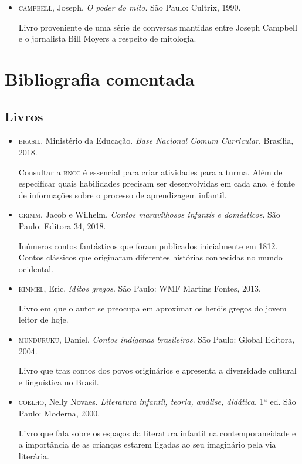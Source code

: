 \documentclass[11pt]{extarticle}
\begin{document}
\begin{itemize}
\item \textsc{campbell}, Joseph. \textit{O poder do mito}. São Paulo: Cultrix, 1990.

Livro proveniente de uma série de conversas mantidas entre Joseph Campbell e o jornalista Bill Moyers a respeito de mitologia.
\end{itemize}

\section{Bibliografia comentada}
\subsection{Livros}

\begin{itemize}
\item \textsc{brasil}. Ministério da Educação. \textit{Base Nacional Comum Curricular}. Brasília, 2018.

Consultar a \textsc{bncc} é essencial para criar atividades para a turma. Além de especificar quais habilidades precisam ser desenvolvidas em cada ano, é fonte de informações sobre o processo de aprendizagem infantil. 
 
 \item \textsc{grimm}, Jacob e Wilhelm. \textit{Contos maravilhosos infantis e domésticos}. São Paulo: Editora 34, 2018.

Inúmeros contos fantásticos que foram publicados inicialmente em 1812. Contos clássicos que originaram diferentes histórias conhecidas no mundo ocidental.

\item \textsc{kimmel}, Eric. \textit{Mitos gregos}. São Paulo: WMF Martins Fontes, 2013.

Livro em que o autor se preocupa em aproximar os heróis gregos do jovem leitor de hoje.

\item \textsc{munduruku}, Daniel. \textit{Contos indígenas brasileiros}. São Paulo: Global Editora, 2004.

Livro que traz contos dos povos originários e apresenta a diversidade cultural e linguística no Brasil.

\item \textsc{coelho}, Nelly Novaes. \textit{Literatura infantil, teoria, análise, didática}. 1ª ed. São Paulo: Moderna, 2000.

Livro que fala sobre os espaços da literatura infantil na contemporaneidade e a importância de as crianças estarem ligadas ao seu imaginário pela via literária.

\end{itemize}
\end{document}
